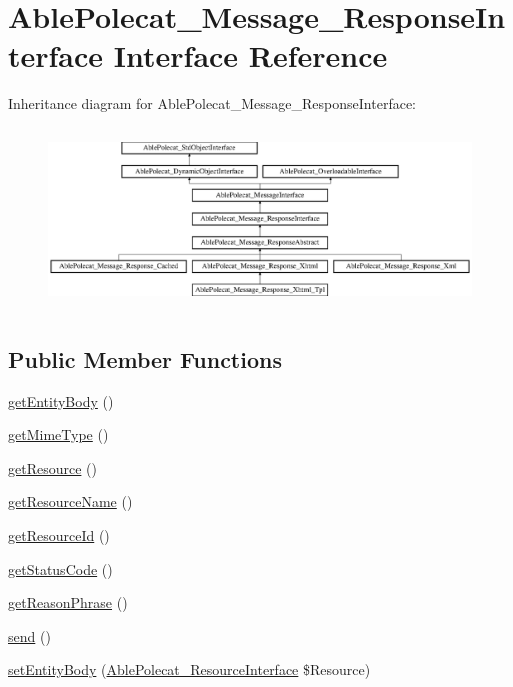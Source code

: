 \hypertarget{interface_able_polecat___message___response_interface}{}\section{Able\+Polecat\+\_\+\+Message\+\_\+\+Response\+Interface Interface Reference}
\label{interface_able_polecat___message___response_interface}
Inheritance diagram for Able\+Polecat\+\_\+\+Message\+\_\+\+Response\+Interface\+:\begin{figure}[H]
\begin{center}
\leavevmode
\includegraphics[height=4.839506cm]{interface_able_polecat___message___response_interface}
\end{center}
\end{figure}
\subsection*{Public Member Functions}
\begin{DoxyCompactItemize}
\item 
\hyperlink{interface_able_polecat___message___response_interface_a0841bf6c2f3e1f97f8c789475ee95b05}{get\+Entity\+Body} ()
\item 
\hyperlink{interface_able_polecat___message___response_interface_ac06e9f7b10fca30eb41e41d4dc108b1c}{get\+Mime\+Type} ()
\item 
\hyperlink{interface_able_polecat___message___response_interface_a8c5a689e9be7d35d0d01d0194637a7d2}{get\+Resource} ()
\item 
\hyperlink{interface_able_polecat___message___response_interface_a07180209c1103f29ab7e12231a62e88b}{get\+Resource\+Name} ()
\item 
\hyperlink{interface_able_polecat___message___response_interface_a0ac412173b2b1d569ef90a1ac095ca5d}{get\+Resource\+Id} ()
\item 
\hyperlink{interface_able_polecat___message___response_interface_a094778dd1c04fe44626000b47ea0c0bb}{get\+Status\+Code} ()
\item 
\hyperlink{interface_able_polecat___message___response_interface_ad2574b5790012944a05218ed095d919d}{get\+Reason\+Phrase} ()
\item 
\hyperlink{interface_able_polecat___message___response_interface_a12bcef5130168b80d3d52dc82213f19a}{send} ()
\item 
\hyperlink{interface_able_polecat___message___response_interface_a858ab2a95af7d312509c203de5c6fb11}{set\+Entity\+Body} (\hyperlink{interface_able_polecat___resource_interface}{Able\+Polecat\+\_\+\+Resource\+Interface} \$Resource)
\end{DoxyCompactItemize}
